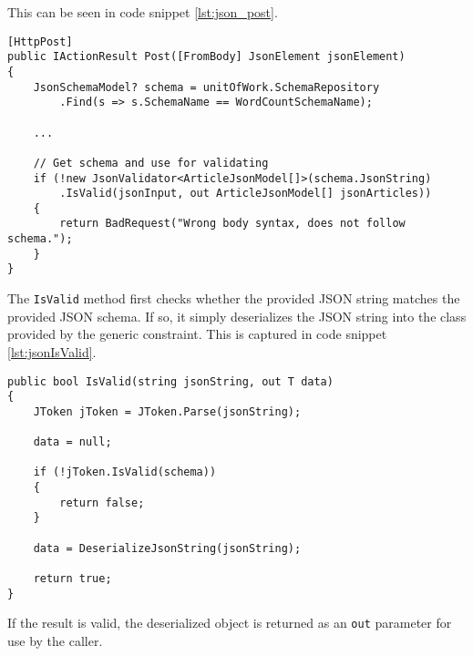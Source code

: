 This can be seen in code snippet \ref{lst:json_post}.

\begin{lstlisting}[language=CSharp, caption={Snippet from the \texttt{POST} method showing validation of the input JSON.}, label={lst:json_post}]
[HttpPost]
public IActionResult Post([FromBody] JsonElement jsonElement)
{
	JsonSchemaModel? schema = unitOfWork.SchemaRepository
		.Find(s => s.SchemaName == WordCountSchemaName);
	
	...

	// Get schema and use for validating
	if (!new JsonValidator<ArticleJsonModel[]>(schema.JsonString)
		.IsValid(jsonInput, out ArticleJsonModel[] jsonArticles))
	{
		return BadRequest("Wrong body syntax, does not follow schema.");
	}
}
\end{lstlisting}

The \texttt{IsValid} method first checks whether the provided JSON string matches the provided JSON schema.
If so, it simply deserializes the JSON string into the class provided by the generic constraint.
This is captured in code snippet \ref{lst:jsonIsValid}.

\begin{lstlisting}[language=CSharp, caption={The \texttt{IsValid} method from the \texttt{JsonValidator} class.}, label={lst:jsonIsValid}]
public bool IsValid(string jsonString, out T data)
{
	JToken jToken = JToken.Parse(jsonString);

	data = null;

	if (!jToken.IsValid(schema))
	{
		return false;
	}

	data = DeserializeJsonString(jsonString);

	return true;
}
\end{lstlisting}

If the result is valid, the deserialized object is returned as an \texttt{out} parameter for use by the caller.
